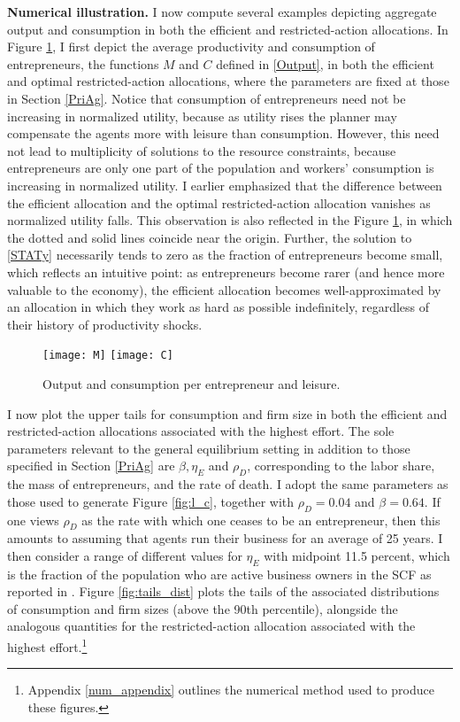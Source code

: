 \documentclass[11pt]{article}
\theoremstyle{plain}
\newcommand{\betaval}{0.64}
\begin{document}
\textbf{Numerical illustration.} I now compute several examples depicting aggregate output and consumption in both the efficient and restricted-action allocations. In Figure \ref{fig:RC_pre}, I first depict the average productivity and consumption of entrepreneurs, the functions $M$ and $C$ defined in \eqref{Output}, in both the efficient and optimal restricted-action allocations, where the parameters are fixed at those in Section \ref{PriAg}. Notice that consumption of entrepreneurs need not be increasing in normalized utility, because as utility rises the planner may compensate the agents more with leisure than consumption. However, this need not lead to multiplicity of solutions to the resource constraints, because entrepreneurs are only one part of the population and workers' consumption is increasing in normalized utility. I earlier emphasized that the difference between the efficient allocation and the optimal restricted-action allocation vanishes as normalized utility falls. This observation is also reflected in the Figure \ref{fig:RC_pre}, in which the dotted and solid lines coincide near the origin. Further, the solution to \eqref{STATy} necessarily tends to zero as the fraction of entrepreneurs become small, which reflects an intuitive point: as entrepreneurs become rarer (and hence more valuable to the economy), the efficient allocation becomes well-approximated by an allocation in which they work as hard as possible indefinitely, regardless of their history of productivity shocks.

\begin{figure} %
\centering
\texttt{[image: M]}
\texttt{[image: C]}
\caption{Output and consumption per entrepreneur and leisure.}\label{fig:RC_pre}
\end{figure}%

I now plot the upper tails for consumption and firm size in both the efficient and restricted-action allocations associated with the highest effort. The sole parameters relevant to the general equilibrium setting in addition to those specified in Section \ref{PriAg} are $\beta, \eta_E$ and $\rho_D$, corresponding to the labor share, the mass of entrepreneurs, and the rate of death. I adopt the same parameters as those used to generate Figure \ref{fig:l_c}, together with $\rho_D = 0.04$ and $\beta = \betaval$. If one views $\rho_D$ as the rate with which one ceases to be an entrepreneur, then this amounts to assuming that agents run their business for an average of 25 years. I then consider a range of different values for $\eta_E$ with midpoint 11.5 percent, which is the fraction of the population who are active business owners in the SCF as reported in \cite{cagetti_entrepreneurship_2006}. Figure \ref{fig:tails_dist} plots the tails of the associated distributions of consumption and firm sizes (above the 90th percentile), alongside the analogous quantities for the restricted-action allocation associated with the highest effort.\footnote{Appendix \ref{num_appendix} outlines the numerical method used to produce these figures.}
\end{document}
